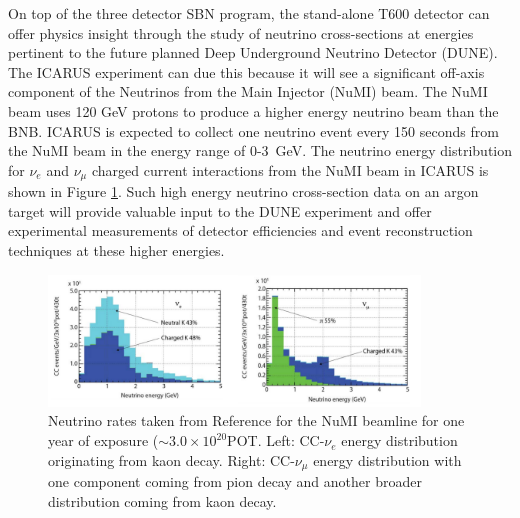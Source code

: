 On top of the three detector SBN program, the stand-alone T600 detector can offer physics insight through the study of neutrino cross-sections at energies pertinent to the future planned Deep Underground Neutrino Detector (DUNE). The ICARUS experiment can due this because it will see a significant off-axis component of the Neutrinos from the Main Injector (NuMI) beam. The NuMI beam uses 120 GeV protons to produce a higher energy neutrino beam than the BNB. ICARUS is expected to collect one neutrino event every 150 seconds from the NuMI beam in the energy range of 0-3~GeV. The neutrino energy distribution for $\nu_{e}$ and $\nu_{\mu}$ charged current interactions from the NuMI beam in ICARUS is shown in Figure \ref{fig:NuMIICARUS}. Such high energy neutrino cross-section data on an argon target will provide valuable input to the DUNE experiment and offer experimental measurements of detector efficiencies and event reconstruction techniques at these higher energies.

\begin{figure}[htb]
\centering
\includegraphics[width=0.88\textwidth]{images/ICARUS_NUMI.png}
\caption[]{Neutrino rates taken from Reference \cite{} for the NuMI beamline for one year of exposure ($\sim 3.0 \times 10^{20}$POT. Left: CC-$\nu_{e}$ energy distribution originating from kaon decay. Right: CC-$\nu_{\mu}$ energy distribution with one component coming from pion decay and another broader distribution coming from kaon decay.}
\label{fig:NuMIICARUS}
\end{figure}

